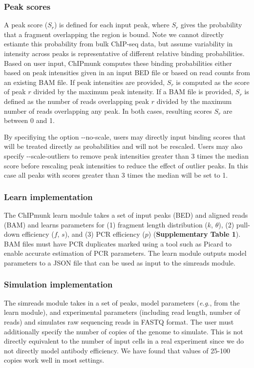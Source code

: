 \documentclass[12pt]{article}
\begin{document}
\subsubsection*{Peak scores}
A peak score ($S_r$) is defined for each input peak, where $S_r$ gives the probability that a fragment overlapping the region is bound.
Note we cannot directly estiamte this probability from bulk ChIP-seq data, but assume variability in intensity across peaks is representative of different relative binding probabilities.
Based on user input, ChIPmunk computes these binding probabilities either based on peak intensities given in an input BED file or based on read counts from an existing BAM file.
If peak intensities are provided, $S_r$ is computed as the score of peak $r$ divided by the maximum peak intensity.
If a BAM file is provided, $S_r$ is defined as the number of reads overlapping peak $r$ divided by the maximum number of reads overlapping any peak.
In both cases, resulting scores $S_r$ are between 0 and 1.

By specifiying the option -{}-no-scale, users may directly input binding scores that will be treated directly as probabilities and will not be rescaled.
Users may also specify -{}-scale-outliers to remove peak intensities greater than 3 times the median score before rescaling peak intensities to reduce the effect of outlier peaks. In this case all peaks with scores greater than 3 times the median will be set to 1.

\subsubsection*{Learn implementation}
The ChIPmunk learn module takes a set of input peaks (BED) and aligned reads (BAM) and learns parameters for (1) fragment length distribution ($k$, $\theta$), (2) pull-down efficiency ($f$, $s$), and (3) PCR efficiency ($p$) (\textbf{Supplementary Table 1}).
BAM files must have PCR duplicates marked using a tool such as Picard \cite{picard} to enable accurate estimation of PCR parameters.
The learn module  outputs model parameters to a JSON file that can be used as input to the simreads module.

\subsubsection*{Simulation implementation}

The simreads module takes in a set of peaks, model parameters (\emph{e.g.}, from the learn module), and experimental parameters (including read length, number of reads) and simulates raw sequencing reads in FASTQ format.
The user must additionally specify the number of copies of the genome to simulate. This is not directly equivalent to the number of input cells in a real experiment since we do not directly model antibody efficiency. We have found that values of 25-100 copies work well in most settings.
\end{document}
